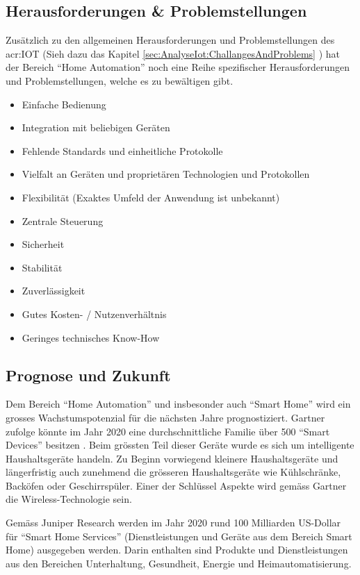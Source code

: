 \subsection{Herausforderungen \& Problemstellungen}
Zusätzlich zu den allgemeinen Herausforderungen und Problemstellungen des \gls{acr:IOT} (Sieh dazu das Kapitel \ref{sec:AnalyseIot:ChallangesAndProblems} ) hat der Bereich "`Home Automation"' noch eine Reihe spezifischer Herausforderungen und Problemstellungen, welche es zu bewältigen gibt.

\begin{itemize}
\item Einfache Bedienung
\item Integration mit beliebigen Geräten
\item Fehlende Standards und einheitliche Protokolle
\item Vielfalt an Geräten und proprietären Technologien und Protokollen
\item Flexibilität (Exaktes Umfeld der Anwendung ist unbekannt)
\item Zentrale Steuerung
\item Sicherheit
\item Stabilität
\item Zuverlässigkeit
\item Gutes Kosten- / Nutzenverhältnis
\item Geringes technisches Know-How
\end{itemize}

\subsection{Prognose und Zukunft}
Dem Bereich "`Home Automation"' und insbesonder auch "`Smart Home"' wird ein grosses Wachstumspotenzial für die nächsten Jahre prognostiziert. Gartner zufolge könnte im Jahr 2020 eine durchschnittliche Familie über 500 "`Smart Devices"' besitzen \cite{E:Gartner:Prognose:SmartHome}. Beim grössten Teil dieser Geräte wurde es sich um intelligente Haushaltsgeräte handeln. Zu Beginn vorwiegend kleinere Haushaltsgeräte und längerfristig auch zunehmend die grösseren Haushaltsgeräte wie Kühlschränke, Backöfen oder Geschirrspüler. Einer der Schlüssel Aspekte wird gemäss Gartner die Wireless-Technologie sein.

Gemäss Juniper Research werden im Jahr 2020 rund 100 Milliarden US-Dollar für "`Smart Home Services"' (Dienstleistungen und Geräte aus dem Bereich Smart Home) ausgegeben werden. Darin enthalten sind Produkte und Dienstleistungen aus den Bereichen Unterhaltung, Gesundheit, Energie und Heimautomatisierung.

